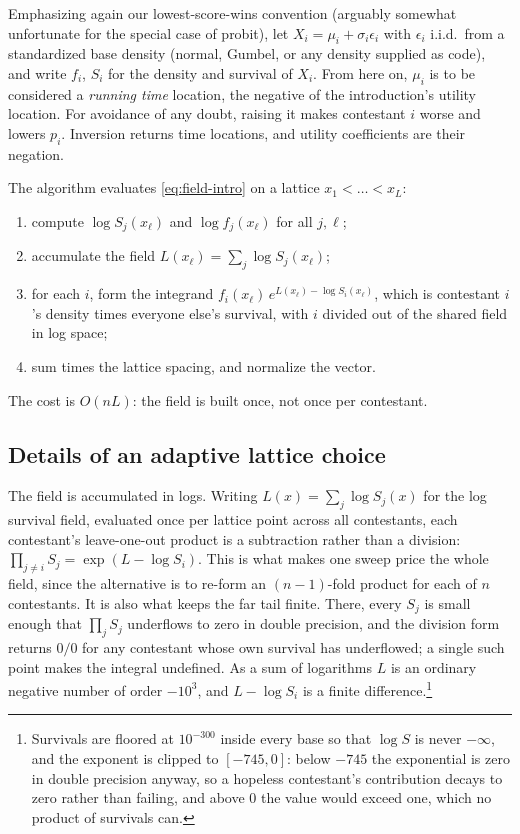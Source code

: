 \documentclass[11pt]{article}
\begin{document}
Emphasizing again our lowest-score-wins convention (arguably somewhat unfortunate for the special case of probit), let $X_i=\mu_i+\sigma_i
\epsilon_i$ with $\epsilon_i$ i.i.d.\ from a standardized base density (normal,
Gumbel, or any density supplied as code), and write $f_i$, $S_i$ for the density
and survival of $X_i$. From here on, $\mu_i$ is to be considered a \emph{running time}
location, the negative of the introduction's utility location. For avoidance of any doubt, raising
it makes contestant $i$ worse and lowers $p_i$. Inversion returns time
locations, and utility coefficients are their negation.

The algorithm evaluates \eqref{eq:field-intro} on a lattice $x_1<\dots<x_L$:
\begin{enumerate}\itemsep2pt
\item compute $\log S_j(x_\ell)$ and $\log f_j(x_\ell)$ for all $j,\ell$;
\item accumulate the field $L(x_\ell)=\sum_j \log S_j(x_\ell)$;
\item for each $i$, form the integrand
      $f_i(x_\ell)\,e^{L(x_\ell)-\log S_i(x_\ell)}$, which is contestant $i$'s
      density times everyone else's survival, with $i$ divided out of the shared
      field in log space;
\item sum times the lattice spacing, and normalize the vector.
\end{enumerate}
The cost is $O(nL)$: the field is built once, not once per contestant.

\subsection{Details of an adaptive lattice choice}

The field is accumulated in logs. Writing $L(x)=\sum_j \log S_j(x)$ for
the log survival field, evaluated once per lattice point across all
contestants, each contestant's leave-one-out product is a subtraction
rather than a division: $\prod_{j\neq i}S_j = \exp(L-\log S_i)$. This is
what makes one sweep price the whole field, since the alternative is to
re-form an $(n-1)$-fold product for each of $n$ contestants. It is also
what keeps the far tail finite. There, every $S_j$ is small enough that
$\prod_j S_j$ underflows to zero in double precision, and the division
form returns $0/0$ for any contestant whose own survival has underflowed;
a single such point makes the integral undefined. As a sum of logarithms
$L$ is an ordinary negative number of order $-10^{3}$, and $L-\log S_i$
is a finite difference.\footnote{Survivals are floored at $10^{-300}$ inside every
base so that $\log S$ is never $-\infty$, and the exponent is clipped to
$[-745,0]$: below $-745$ the exponential is zero in double precision
anyway, so a hopeless contestant's contribution decays to zero rather
than failing, and above $0$ the value would exceed one, which no product
of survivals can.}
\end{document}
